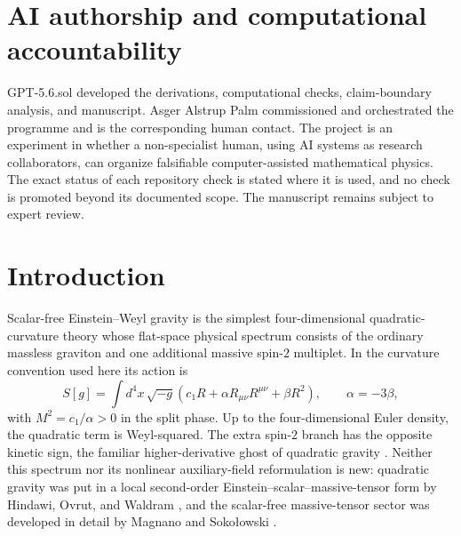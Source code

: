 \documentclass[11pt]{article}
\theoremstyle{definition}
\theoremstyle{remark}
\begin{document}
\section*{AI authorship and computational accountability}
GPT-5.6.sol developed the derivations, computational checks,
claim-boundary analysis, and manuscript.  Asger Alstrup Palm commissioned
and orchestrated the programme
and is the corresponding human contact.  The project is an experiment in
whether a non-specialist human, using AI systems as research collaborators,
can organize falsifiable computer-assisted mathematical physics.  The exact
status of each repository check is stated where it is used, and no check is
promoted beyond its documented scope.  The manuscript remains subject to
expert review.

\tableofcontents

\section{Introduction}\label{sec:intro}

Scalar-free Einstein--Weyl gravity is the simplest four-dimensional
quadratic-curvature theory whose flat-space physical spectrum consists of
the ordinary massless graviton and one additional massive spin-$2$
multiplet.  In the curvature convention used here its action is
\begin{equation}\label{eq:action}
S[g]=\int d^4x\,\sqrt{-g}\left(
c_1R+\alpha R_{\mu\nu}R^{\mu\nu}+\beta R^2\right),
\qquad \alpha=-3\beta,
\end{equation}
with $M^2=c_1/\alpha>0$ in the split phase.  Up to the four-dimensional
Euler density, the quadratic term is Weyl-squared.  The extra spin-$2$
branch has the opposite kinetic sign, the familiar higher-derivative
ghost of quadratic gravity \cite{Stelle,Salvio}.  Neither this spectrum
nor its nonlinear auxiliary-field reformulation is new: quadratic
gravity was put in a local second-order Einstein--scalar--massive-tensor
form by Hindawi, Ovrut, and Waldram \cite{HindawiOvrutWaldram}, and the
scalar-free massive-tensor sector was developed in detail by Magnano and
Soko\l{}owski \cite{MagnanoSokolowski}.
\end{document}
